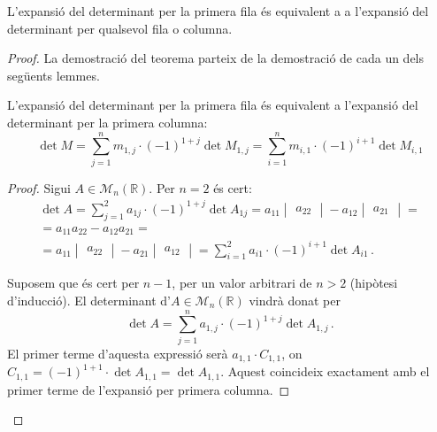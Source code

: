 \begin{teo}
	L'expansió del determinant per la primera fila és equivalent a a l'expansió del determinant per qualsevol fila o columna.

\begin{proof}
	La demostració del teorema parteix de la demostració de cada un dels següents lemmes.
\begin{lema}\label{lema:columna}
		L'expansió del determinant per la primera fila és equivalent a l'expansió del determinant per la primera columna: \[\det M = \sum_{j=1}^{n} m_{1,j}\cdot(-1)^{1+j}\det M_{1,j} = \sum_{i=1}^{n} m_{i,1}\cdot(-1)^{i+1}\det M_{i,1} \]
		\begin{adjustwidth}{0.8cm}{}
		\begin{proof}
		Sigui $A \in \mathcal{M}_n(\mathbb{R})$. Per $n = 2$ és cert:
		\begin{equation*}
		\begin{gathered}		
		\det A = 
		\sum_{j=1}^{2} a_{1j}\cdot (-1)^{1+j}\det A_{1j} = a_{11}\begin{vmatrix}a_{22}\end{vmatrix} - a_{12}\begin{vmatrix}a_{21}\end{vmatrix} =\\
%
		=a_{11}a_{22} - a_{12}a_{21} =\\
%
		 =a_{11}\begin{vmatrix}a_{22}\end{vmatrix} - a_{21}\begin{vmatrix}a_{12}\end{vmatrix} = \sum_{i=1}^{2} a_{i1}\cdot (-1)^{i+1}\det A_{i1}\,.
		\end{gathered}
		\end{equation*}
		
		Suposem que és cert per $n-1$, per un valor arbitrari de $n>2$ (hipòtesi d'inducció). El determinant d'$A\in\mathcal{M}_n(\mathbb{R})$ vindrà donat per
		\begin{equation}\label{eq:det1}
			 \det A = \sum_{j=1}^{n} a_{1,j}\cdot(-1)^{1+j}\det A_{1,j}  \,.
		\end{equation} 
		El primer terme d'aquesta expressió serà $a_{1,1}\cdot C_{1,1}$, on $C_{1,1} =(-1)^{1+1}\cdot\det A_{1,1} = \det A_{1,1}$. Aquest coincideix exactament amb el primer terme de l'expansió per primera columna. 
		

\end{proof}
\end{adjustwidth}
\end{lema}
\end{proof}
\end{teo}
